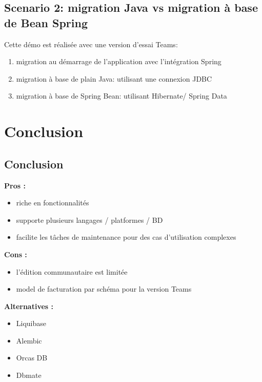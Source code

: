 \documentclass[slidestop,compress,11pt,xcolor=dvipsnames,french]{beamer}
\begin{document}
\subsection*{Scenario 2: migration Java vs migration à base de Bean Spring}
\begin{frame}
Cette démo est réalisée avec une version d'essai Teams: 
\begin{enumerate}
 \item migration au démarrage de l'application avec l'intégration Spring
 \item migration à base de plain Java: utilisant une connexion JDBC
 \item migration à base de Spring Bean: utilisant Hibernate/ Spring Data
\end{enumerate}
\end{frame}

\section[Conclusion]{Conclusion}
\subsection*{Conclusion}
\begin{frame}
\textbf {Pros : \\}
\begin{itemize}
 \item riche en fonctionnalités 
 \item supporte plusieurs langages / platformes / BD
 \item facilite les tâches de maintenance pour des cas d'utilisation complexes
\end{itemize}
\textbf {Cons : \\}
\begin{itemize}
 \item l'édition communautaire est limitée 
 \item model de facturation par schéma pour la version Teams
\end{itemize}
\textbf {Alternatives : \\}
\begin{itemize}
 \item Liquibase 
 \item Alembic
 \item Orcas DB
 \item Dbmate
\end{itemize}
\end{frame}
\end{document}
